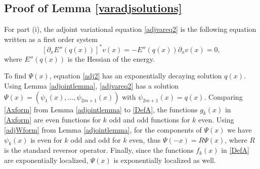 \documentclass[thesis.tex]{subfiles}
\begin{document}
\subsection{Proof of Lemma \ref{varadjsolutions}}
For part (i), the adjoint variational equation \eqref{adjvareq2} is the following equation written as a first order system
\begin{equation}\label{adj2}
[\partial_x E''(q(x)) ]^* v(x) = -E''(q(x)) \partial_x v(x) = 0,
\end{equation}
where $E''(q(x))$ is the Hessian of the energy. 

To find $\Psi(x)$, equation \ref{adj2} has an exponentially decaying solution $q(x)$. Using Lemma \ref{adjointlemma}, \eqref{adjvareq2} has a solution $\Psi(x) = (\psi_1(x), \dots, \psi_{2m+1}(x))$ with $\psi_{2m+1}(x) = q(x)$. Comparing \eqref{Axform} from Lemma \ref{adjointlemma} to \eqref{DefA}, the functions $g_k(x)$ in \eqref{Axform} are even functions for $k$ odd and odd functions for $k$ even. Using \eqref{adjWform} from Lemma \ref{adjointlemma}, for the components of $\Psi(x)$ we have $\psi_k(x)$ is even for $k$ odd and odd for $k$ even, thus $\Psi(-x) = R \Psi(x)$, where $R$ is the standard reversor operator. Finally, since the functions $f_k(x)$ in \eqref{DefA} are exponentially localized, $\Psi(x)$ is exponentially localized as well.
\end{document}
